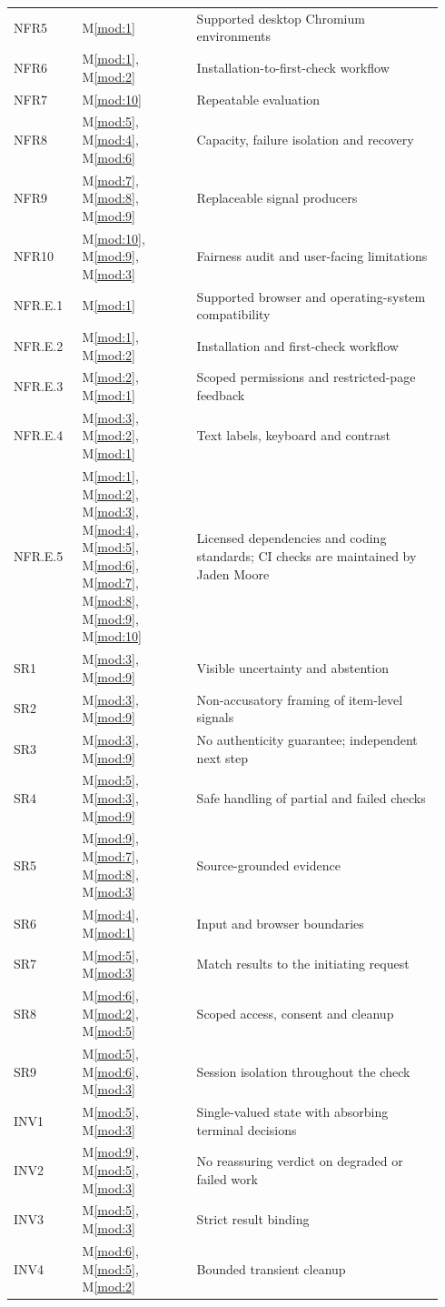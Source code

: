 \documentclass[12pt, titlepage]{article}
\newcommand{\mref}[1]{M\ref{#1}}
\newcommand{\modref}[1]{\mref{mod:#1}}
\begin{document}
\begin{longtable}{@{}p{0.15\linewidth}p{0.25\linewidth}p{0.54\linewidth}@{}}
NFR5 & \modref{1} & Supported desktop Chromium environments \\
NFR6 & \modref{1}, \modref{2} & Installation-to-first-check workflow \\
NFR7 & \modref{10} & Repeatable evaluation \\
NFR8 & \modref{5}, \modref{4}, \modref{6} & Capacity, failure isolation and recovery \\
NFR9 & \modref{7}, \modref{8}, \modref{9} & Replaceable signal producers \\
NFR10 & \modref{10}, \modref{9}, \modref{3} & Fairness audit and user-facing limitations \\
NFR.E.1 & \modref{1} & Supported browser and operating-system compatibility \\
NFR.E.2 & \modref{1}, \modref{2} & Installation and first-check workflow \\
NFR.E.3 & \modref{2}, \modref{1} & Scoped permissions and restricted-page feedback \\
NFR.E.4 & \modref{3}, \modref{2}, \modref{1} & Text labels, keyboard and contrast \\
NFR.E.5 & \modref{1}, \modref{2}, \modref{3}, \modref{4}, \modref{5}, \modref{6}, \modref{7}, \modref{8}, \modref{9}, \modref{10} & Licensed dependencies and coding standards; CI checks are maintained by Jaden Moore \\
SR1 & \modref{3}, \modref{9} & Visible uncertainty and abstention \\
SR2 & \modref{3}, \modref{9} & Non-accusatory framing of item-level signals \\
SR3 & \modref{3}, \modref{9} & No authenticity guarantee; independent next step \\
SR4 & \modref{5}, \modref{3}, \modref{9} & Safe handling of partial and failed checks \\
SR5 & \modref{9}, \modref{7}, \modref{8}, \modref{3} & Source-grounded evidence \\
SR6 & \modref{4}, \modref{1} & Input and browser boundaries \\
SR7 & \modref{5}, \modref{3} & Match results to the initiating request \\
SR8 & \modref{6}, \modref{2}, \modref{5} & Scoped access, consent and cleanup \\
SR9 & \modref{5}, \modref{6}, \modref{3} & Session isolation throughout the check \\
INV1 & \modref{5}, \modref{3} & Single-valued state with absorbing terminal decisions \\
INV2 & \modref{9}, \modref{5}, \modref{3} & No reassuring verdict on degraded or failed work \\
INV3 & \modref{5}, \modref{3} & Strict result binding \\
INV4 & \modref{6}, \modref{5}, \modref{2} & Bounded transient cleanup \\
\bottomrule
\end{longtable}
\end{document}
